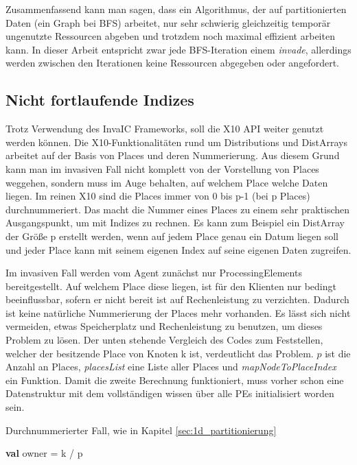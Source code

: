 Zusammenfassend kann man sagen, dass ein Algorithmus, der auf partitionierten Daten (ein Graph bei BFS) arbeitet, nur sehr schwierig gleichzeitig temporär ungenutzte Ressourcen abgeben und trotzdem noch maximal effizient arbeiten kann. In dieser Arbeit entspricht zwar jede BFS-Iteration einem \textit{invade}, allerdings werden zwischen den Iterationen keine Ressourcen abgegeben oder angefordert.

\subsection{Nicht fortlaufende Indizes} %
\label{ssub:nicht_fortlaufende_indizes}
Trotz Verwendung des InvaIC Frameworks, soll die X10 API weiter genutzt werden können. Die X10-Funktionalitäten rund um Distributions und DistArrays arbeitet auf der Basis von Places und deren Nummerierung. Aus diesem Grund kann man im invasiven Fall nicht komplett von der Vorstellung von Places weggehen, sondern muss im Auge behalten, auf welchem Place welche Daten liegen. Im reinen X10 sind die Places immer von 0 bis p-1 (bei p Places) durchnummeriert. Das macht die Nummer eines Places zu einem sehr praktischen Ausgangspunkt, um mit Indizes zu rechnen. Es kann zum Beispiel ein DistArray der Größe p erstellt werden, wenn auf jedem Place genau ein Datum liegen soll und jeder Place kann mit seinem eigenen Index auf seine eigenen Daten zugreifen.

Im invasiven Fall werden vom Agent zunächst nur ProcessingElements bereitgestellt. Auf welchem Place diese liegen, ist für den Klienten nur bedingt beeinflussbar, sofern er nicht bereit ist auf Rechenleistung zu verzichten. Dadurch ist keine natürliche Nummerierung der Places mehr vorhanden. Es lässt sich nicht vermeiden, etwas Speicherplatz und Rechenleistung zu benutzen, um dieses Problem zu lösen. Der unten stehende Vergleich des Codes zum Feststellen, welcher der besitzende Place von Knoten k ist, verdeutlicht das Problem. $p$ ist die Anzahl an Places, \textit{placesList} eine Liste aller Places und \textit{mapNodeToPlaceIndex} ein Funktion. Damit die zweite Berechnung funktioniert, muss vorher schon eine Datenstruktur mit dem vollständigen wissen über alle PEs initialisiert worden sein.
\begin{algorithm}
	\caption{Durchnummerierter Fall, wie in Kapitel \ref{sec:1d_partitionierung}}
	\label{alg:owner_consecutive}
	\begin{algorithmic}[1]
		\State \textbf{val} owner = k / p
	\end{algorithmic}
\end{algorithm}

